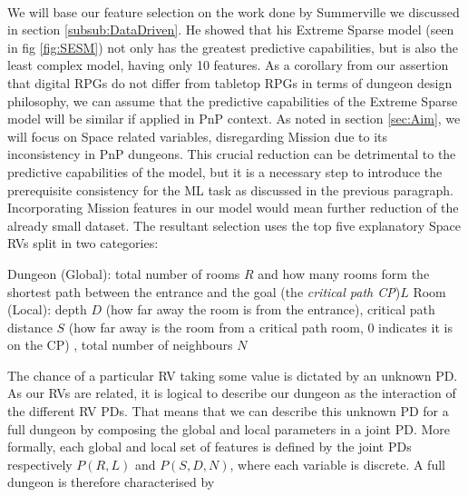 \documentclass{UoYCSproject}
\begin{document}
\paragraph{}
We will base our feature selection on the work done by Summerville we discussed in section \ref{subsub:DataDriven}. He showed that his Extreme Sparse model (seen in fig \ref{fig:SESM}) not only has the greatest predictive capabilities, but is also the least complex model, having only 10 features. As a corollary from our assertion that digital RPGs do not differ from tabletop RPGs in terms of dungeon design philosophy, we can assume that the predictive capabilities of the Extreme Sparse model will be similar if applied in PnP context. As noted in section \ref{sec:Aim}, we will focus on Space related variables, disregarding Mission due to its inconsistency in PnP dungeons. This crucial reduction can be detrimental to the predictive capabilities of the model, but it is a necessary step to introduce the prerequisite consistency for the ML task as discussed in the previous paragraph. Incorporating Mission features in our model would mean further reduction of the already small dataset. The resultant selection uses the top five explanatory Space RVs split in two categories: 
\begin{outline}[enumerate]
  \1 Dungeon (Global): total number of rooms \(R\) and how many rooms form the shortest path between the entrance and the goal (the \textit{critical path CP})\(L\)
  \1 Room (Local): depth \(D\) (how far away the room is from the entrance), critical path distance \(S\) (how far away is the room from a critical path room, 0 indicates it is on the CP) , total number of neighbours \(N\)
\end{outline}
The chance of a particular RV taking some value is dictated by an unknown PD. As our RVs are related, it is logical to describe our dungeon as the interaction of the different RV PDs. That means that we can describe this unknown PD for a full dungeon by composing the global and local parameters in a joint PD. More formally, each global and local set of features is defined by the joint PDs respectively \(P(R, L)\) and \(P(S, D, N)\), where each variable is discrete. A full dungeon is therefore characterised by 
\end{document}
